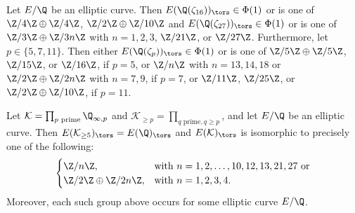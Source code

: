\begin{frame}[plain]
\scriptsize
\begin{thm}[Gu{\u{z}}vi\'c, Vukorepa, 2022]
Let $E/\Q$ be an elliptic curve. Then $E(\Q(\zeta_{16}))_\tors \in \Phi(1)$ or is one of $\Z/4\Z \oplus \Z/4\Z$, $\Z/2\Z \oplus \Z/10\Z$ and $E(\Q(\zeta_{27}))_\tors \in \Phi(1)$ or is one of $\Z/3\Z \oplus \Z/3n\Z$ with $n= 1, 2, 3$, $\Z/21\Z$, or $\Z/27\Z$. Furthermore, let $p \in \{5, 7, 11 \}$. Then either $E(\Q(\zeta_p))_\tors \in \Phi(1)$ or is one of $\Z/5\Z \oplus \Z/5\Z$, $\Z/15\Z$, or $\Z/16\Z$, if $p= 5$, or $\Z/n\Z$ with $n= 13, 14, 18$ or $\Z/2\Z \oplus \Z/2n\Z$ with $n= 7, 9$, if $p= 7$, or $\Z/11\Z$, $\Z/25\Z$, or $\Z/2\Z \oplus \Z/10\Z$, if $p= 11$. 
\end{thm}

\begin{thm}[Gu{\u{z}}vi\'c, Krijan, 2020]
Let $\mathcal{K}= \prod_{p \text{ prime}} \Q_{\infty, p}$ and $\mathcal{K}_{\geq p}= \prod_{q \text{ prime}, q \geq p}$, and let $E/\Q$ be an elliptic curve. Then $E(\mathcal{K}_{\geq 5})_\tors= E(\Q)_\tors$ and $E(\mathcal{K})_\tors$ is isomorphic to precisely one of the following:
	\[
	\begin{cases}
	\Z/n\Z, & \text{with } n= 1, 2, \ldots, 10, 12, 13, 21, 27 \text{ or} \\
	\Z/2\Z \oplus \Z/2n\Z, & \text{with } n= 1, 2, 3, 4. \\
	\end{cases}
	\]
Moreover, each such group above occurs for some elliptic curve $E/\Q$. 
\end{thm}


\end{frame}
